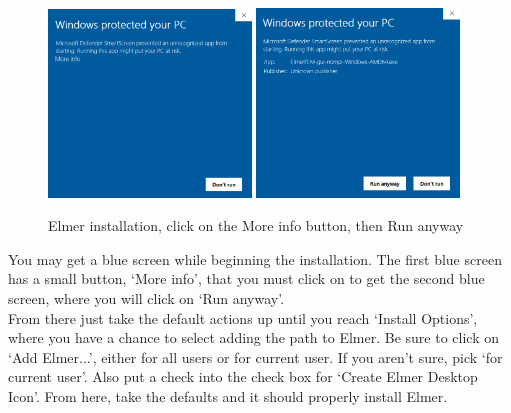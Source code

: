 \begin{figure}[H]
\begin{center}
\includegraphics[width=0.48\textwidth]{installer-1}
\includegraphics[width=0.48\textwidth]{installer-2}
\caption{Elmer installation, click on the More info button, then Run anyway}\label{fg:installer-1}
\end{center}
\end{figure}

You may get a blue screen while beginning the installation.  The first blue screen has a small button, `More info', that you must click on to get the second blue screen, where you will click on `Run anyway'. \\

From there just take the default actions up until you reach `Install Options', where you have a chance to select adding the path to Elmer.  Be sure to click on `Add Elmer...', either for all users or for current user.  If you aren't sure, pick `for current user'.  Also put a check into the check box for `Create Elmer Desktop Icon'.  From here, take the defaults and it should properly install Elmer.

